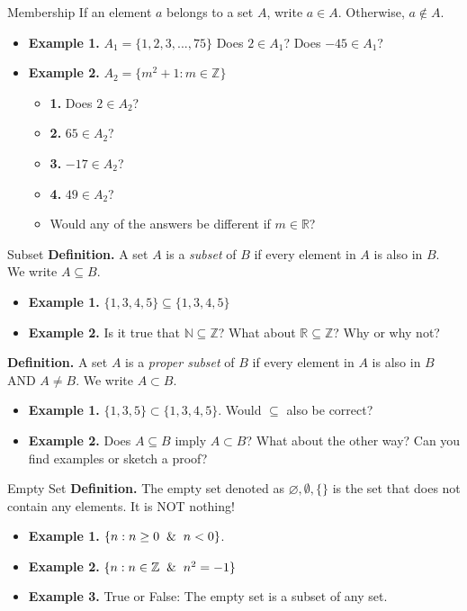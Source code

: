 \documentclass[10pt]{beamer}
\begin{document}
\begin{frame}{Membership}
    If an element $a$ belongs to a set $A$, write $a \in A$. Otherwise, $a \notin A$.
    \begin{itemize}
        \item \textbf{Example 1.} $A_1 = \{1,2,3,...,75 \}$ Does $2 \in A_1$? Does $-45 \in A_1$?
        \item \textbf{Example 2.} $A_2 = \{m^2 + 1: m \in \mathbb{Z}  \}$
            \begin{itemize}
                \item \textbf{1.} Does $2 \in A_2$?
                \item \textbf{2.} $65 \in A_2$?
                \item \textbf{3.} $-17 \in A_2$?
                \item \textbf{4.} $49 \in A_2$?
                \item Would any of the answers be different if $m \in \mathbb{R}$?
            \end{itemize}
    \end{itemize}
\end{frame}

\begin{frame}{Subset}
    \textbf{Definition.} A set $A$ is a \textit{subset} of $B$ if every element in $A$ is also in $B$. We write $A \subseteq B$.
    \begin{itemize}
        \item \textbf{Example 1.} $\{1,3,4,5\} \subseteq \{1,3,4,5\}$
        \item \textbf{Example 2.} Is it true that $\mathbb{N} \subseteq \mathbb{Z}$? What about $\mathbb{R} \subseteq \mathbb{Z}$? Why or why not?
    \end{itemize}

    \textbf{Definition.} A set $A$ is a \textit{proper subset} of $B$ if every element in $A$ is also in $B$ AND $A \neq B$. We write $A \subset B$.
    \begin{itemize}
        \item \textbf{Example 1.} $\{1,3,5\} \subset \{1,3,4,5\}$. Would $\subseteq$ also be correct?
        \item \textbf{Example 2.} Does $A \subseteq B$ imply $A \subset B$? What about the other way? Can you find examples or sketch a proof?
    \end{itemize}
\end{frame}

\begin{frame}{Empty Set}
    \textbf{Definition.} The empty set denoted as $\varnothing, \emptyset, \{\}$ is the set that does not contain any elements. It is NOT nothing!\\
    \begin{itemize}
        \item \textbf{Example 1.} $\{n:n\geq 0 \And n < 0\}$.
        \item \textbf{Example 2.} $\{n:n \in \mathbb{Z} \And n^2 = -1 \}$
        \item \textbf{Example 3.} True or False: The empty set is a subset of any set.
    \end{itemize}
\end{frame}
\end{document}
